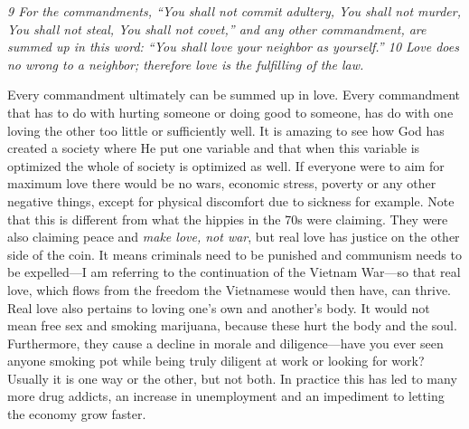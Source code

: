 \emph{9 For the commandments, ``You shall not commit adultery, You shall
not murder, You shall not steal, You shall not covet,'' and any other
commandment, are summed up in this word: ``You shall love your neighbor
as yourself.'' 10 Love does no wrong to a neighbor; therefore love is
the fulfilling of the law.}

Every commandment ultimately can be summed up in love. Every commandment
that has to do with hurting someone or doing good to someone, has do
with one loving the other too little or sufficiently well. It is amazing
to see how God has created a society where He put one variable and that
when this variable is optimized the whole of society is optimized as
well. If everyone were to aim for maximum love there would be no wars,
economic stress, poverty or any other negative things, except for
physical discomfort due to sickness for example. Note that this is
different from what the hippies in the 70s were claiming. They were also
claiming peace and \emph{make love, not war}, but real love has justice
on the other side of the coin. It means criminals need to be punished
and communism needs to be expelled---I am referring to the continuation
of the Vietnam War---so that real love, which flows from the freedom the
Vietnamese would then have, can thrive. Real love also pertains to
loving one's own and another's body. It would not mean free sex and
smoking marijuana, because these hurt the body and the soul.
Furthermore, they cause a decline in morale and diligence---have you
ever seen anyone smoking pot while being truly diligent at work or
looking for work? Usually it is one way or the other, but not both. In
practice this has led to many more drug addicts, an increase in
unemployment and an impediment to letting the economy grow faster.

